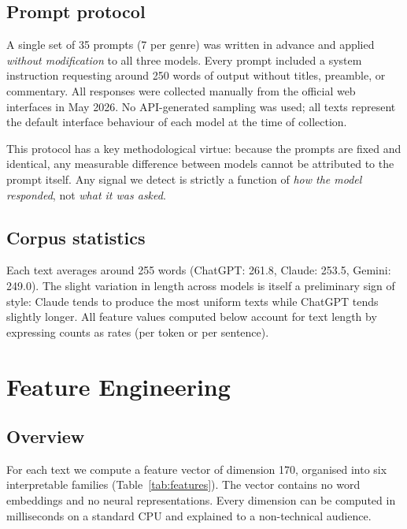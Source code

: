 \documentclass[11pt,a4paper]{article}
\begin{document}
\subsection{Prompt protocol}

A single set of 35 prompts (7 per genre) was written in advance and
applied \emph{without modification} to all three models. Every prompt
included a system instruction requesting around 250 words of output
without titles, preamble, or commentary. All responses were collected
manually from the official web interfaces in May 2026. No
API-generated sampling was used; all texts represent the default
interface behaviour of each model at the time of collection.

This protocol has a key methodological virtue: because the prompts
are fixed and identical, any measurable difference between models
cannot be attributed to the prompt itself. Any signal we detect is
strictly a function of \emph{how the model responded}, not
\emph{what it was asked}.

\subsection{Corpus statistics}

Each text averages around 255 words (ChatGPT: 261.8, Claude: 253.5,
Gemini: 249.0). The slight variation in length across models is
itself a preliminary sign of style: Claude tends to produce the most
uniform texts while ChatGPT tends slightly longer. All feature values
computed below account for text length by expressing counts as rates
(per token or per sentence).

\section{Feature Engineering}
\label{sec:features}

\subsection{Overview}

For each text we compute a feature vector of dimension 170,
organised into six interpretable families (Table~\ref{tab:features}).
The vector contains no word embeddings and no neural representations.
Every dimension can be computed in milliseconds on a standard CPU and
explained to a non-technical audience.
\end{document}
